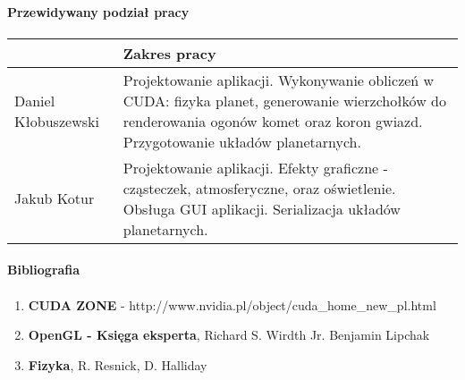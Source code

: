 \documentclass[a4paper,titlepage,10pt]{article}
\begin{document}

	\paragraph{Przewidywany podział pracy}

	\paragraph{}
	\begin{tabular}{|l|p{10cm}|}
	\hline
	~ & Zakres pracy \\\hline
	\hline
	Daniel Kłobuszewski & Projektowanie aplikacji. Wykonywanie obliczeń w CUDA: fizyka planet, generowanie wierzchołków do renderowania ogonów komet oraz koron gwiazd. Przygotowanie układów planetarnych.\\\hline
	Jakub Kotur & Projektowanie aplikacji. Efekty graficzne - cząsteczek, atmosferyczne, oraz oświetlenie. Obsługa GUI aplikacji. Serializacja układów planetarnych.\\\hline
	\end{tabular}

	\paragraph{Bibliografia}
	\paragraph{}
	\fontsize{8}{6}\selectfont
	\begin{enumerate}
	\item {\bf CUDA ZONE} - http://www.nvidia.pl/object/cuda\_home\_new\_pl.html
	\item {\bf OpenGL - Księga eksperta}, Richard S. Wirdth Jr. Benjamin Lipchak
	\item {\bf Fizyka}, R. Resnick, D. Halliday
	\end{enumerate}


	\vfill
	\hspace{.6\textwidth} \makebox[.3\textwidth][l] {\hrulefill} 

	\hspace{.6\textwidth} 
\end{document}
